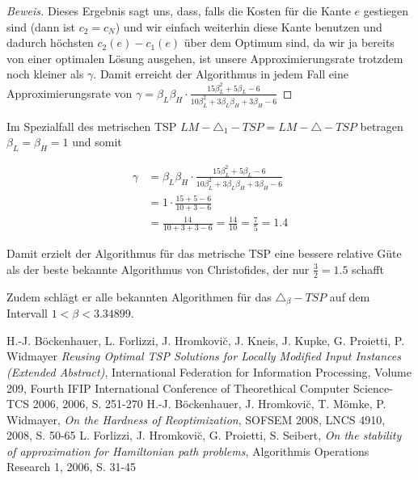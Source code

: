 \documentclass[a4paper,11pt]{scrreprt}
\begin{document}
\begin{proof}[Beweis]
Dieses Ergebnis sagt uns, dass, falls die Kosten für die Kante $e$ gestiegen sind (dann ist $c_2 = c_N$) und wir einfach weiterhin diese Kante benutzen und dadurch höchsten $c_2(e) - c_1(e)$ über dem Optimum sind, da wir ja bereits von einer optimalen Lösung ausgehen, ist unsere Approximierungsrate trotzdem noch kleiner als $\gamma$. Damit erreicht der Algorithmus in jedem Fall eine Approximierungsrate von $\gamma = \beta_L\beta_H \cdot \frac{15\beta_L^2 + 5\beta_L - 6}{10\beta_L^2 + 3\beta_L\beta_H + 3\beta_H -6}$
\end{proof}

Im Spezialfall des metrischen TSP $LM - \triangle_1 - TSP = LM - \triangle - TSP$ betragen $\beta_L = \beta_H = 1$ und somit

\begin{align*}
\gamma &= \beta_L\beta_H \cdot \frac{15\beta_L^2 + 5\beta_L - 6}{10\beta_L^2 + 3\beta_L\beta_H + 3\beta_H -6}\\
&= 1 \cdot \frac{15 + 5 - 6}{10 + 3 - 6}\\
&= \frac{14}{10 + 3 + 3 - 6} = \frac{14}{10} = \frac{7}{5} = 1.4
\end{align*}

Damit erzielt der Algorithmus für das metrische TSP eine bessere relative Güte als der beste bekannte Algorithmus von Christofides, der nur $\frac{3}{2} = 1.5$ schafft

Zudem schlägt er alle bekannten Algorithmen für das $\triangle_\beta-TSP$ auf dem Intervall $1 < \beta < 3.34899$.

\begin{thebibliography}{9}

  H.-J. Böckenhauer, L. Forlizzi, J. Hromkovi\u{c}, J. Kneis, J. Kupke, G. Proietti, P. Widmayer 
  \emph{Reusing Optimal TSP Solutions for Locally Modified Input Instances (Extended Abstract)},
  International Federation for Information Processing, Volume 209, Fourth IFIP International Conference of Theorethical Computer Science-TCS 2006, 2006, S. 251-270
  H.-J. Böckenhauer, J. Hromkovi\u{c}, T. Mömke, P. Widmayer,
  \emph{On the Hardness of Reoptimization},
  SOFSEM 2008, LNCS 4910, 2008, S. 50-65
  L. Forlizzi, J. Hromkovi\u{c}, G. Proietti, S. Seibert,
  \emph{On the stability of approximation for Hamiltonian path problems},
  Algorithmis Operations Research 1, 2006, S. 31-45

\end{thebibliography}
  
\listoffigures
  
\end{document}
